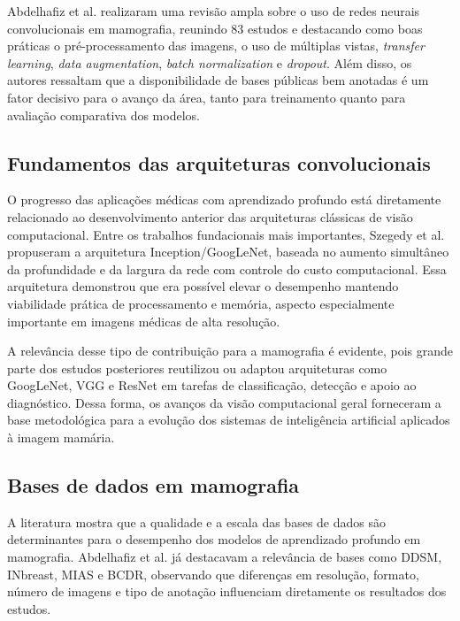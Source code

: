 Abdelhafiz et al. \cite{abdelhafiz2019} realizaram uma revisão ampla sobre o uso de redes neurais convolucionais em mamografia, reunindo 83 estudos e destacando como boas práticas o pré-processamento das imagens, o uso de múltiplas vistas, \textit{transfer learning}, \textit{data augmentation}, \textit{batch normalization} e \textit{dropout}. Além disso, os autores ressaltam que a disponibilidade de bases públicas bem anotadas é um fator decisivo para o avanço da área, tanto para treinamento quanto para avaliação comparativa dos modelos.

\subsection{Fundamentos das arquiteturas convolucionais}

O progresso das aplicações médicas com aprendizado profundo está diretamente relacionado ao desenvolvimento anterior das arquiteturas clássicas de visão computacional. Entre os trabalhos fundacionais mais importantes, Szegedy et al. \cite{szegedy2014} propuseram a arquitetura Inception/GoogLeNet, baseada no aumento simultâneo da profundidade e da largura da rede com controle do custo computacional. Essa arquitetura demonstrou que era possível elevar o desempenho mantendo viabilidade prática de processamento e memória, aspecto especialmente importante em imagens médicas de alta resolução.

A relevância desse tipo de contribuição para a mamografia é evidente, pois grande parte dos estudos posteriores reutilizou ou adaptou arquiteturas como GoogLeNet, VGG e ResNet em tarefas de classificação, detecção e apoio ao diagnóstico. Dessa forma, os avanços da visão computacional geral forneceram a base metodológica para a evolução dos sistemas de inteligência artificial aplicados à imagem mamária.

\subsection{Bases de dados em mamografia}

A literatura mostra que a qualidade e a escala das bases de dados são determinantes para o desempenho dos modelos de aprendizado profundo em mamografia. Abdelhafiz et al. \cite{abdelhafiz2019} já destacavam a relevância de bases como DDSM, INbreast, MIAS e BCDR, observando que diferenças em resolução, formato, número de imagens e tipo de anotação influenciam diretamente os resultados dos estudos.

